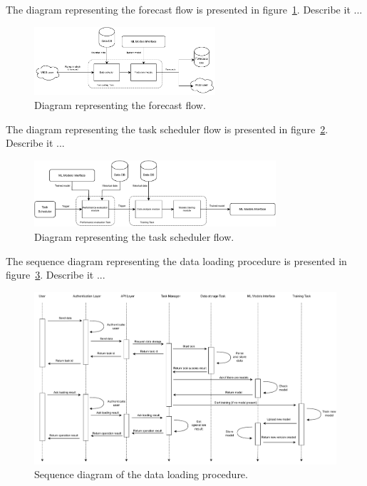 The diagram representing the forecast flow is presented in figure~\ref{fig:forecastflow}.
Describe it ...

\begin{figure}[H]
\centering 
\includegraphics[width=0.6\textwidth]{images/architecture_forecast_flow}
\caption{Diagram representing the forecast flow.}
\label{fig:forecastflow}
\end{figure}

The diagram representing the task scheduler flow is presented in figure~\ref{fig:schedulerflow}.
Describe it ...

\begin{figure}[H]
\centering 
\includegraphics[width=0.8\textwidth]{images/architecture_scheduler_flow}
\caption{Diagram representing the task scheduler flow.}
\label{fig:schedulerflow}
\end{figure}

The sequence diagram representing the data loading procedure is presented in figure~\ref{fig:loadingsequence}.
Describe it ...

\begin{figure}[H]
\centering 
\includegraphics[width=1\textwidth]{images/architecture_data_loading_sequence}
\caption{Sequence diagram of the data loading procedure.}
\label{fig:loadingsequence}
\end{figure}

